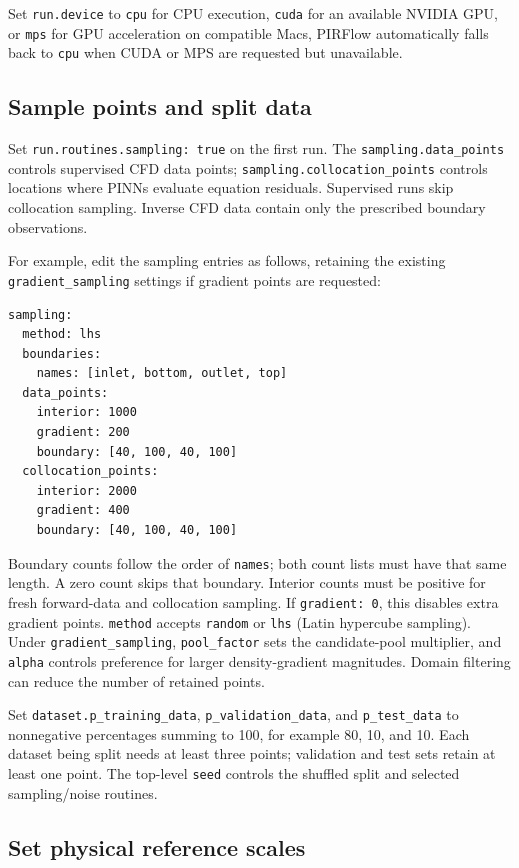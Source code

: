 \documentclass[11pt,a4paper]{article}
\newcommand{\code}[1]{\nolinkurl{#1}}
\begin{document}
Set \code{run.device} to \code{cpu} for CPU execution, \code{cuda} for an
available NVIDIA GPU, or \code{mps} for GPU acceleration on compatible Macs,
PIRFlow automatically falls back to \code{cpu} when CUDA or MPS are requested
but unavailable. 

\subsection{Sample points and split data}

Set \code{run.routines.sampling: true} on the first run. The 
\code{sampling.data_points} controls supervised CFD data points; 
\code{sampling.collocation_points} controls locations where PINNs evaluate 
equation residuals. Supervised runs skip collocation sampling. Inverse CFD 
data contain only the prescribed boundary observations.

For example, edit the sampling entries as follows, retaining the existing
\code{gradient_sampling} settings if gradient points are requested:

\begin{lstlisting}
sampling:
  method: lhs
  boundaries:
    names: [inlet, bottom, outlet, top]
  data_points:
    interior: 1000
    gradient: 200
    boundary: [40, 100, 40, 100]
  collocation_points:
    interior: 2000
    gradient: 400
    boundary: [40, 100, 40, 100]
\end{lstlisting}

Boundary counts follow the order of \code{names}; both count lists must have that
same length. A zero count skips that boundary. Interior counts must be positive
for fresh forward-data and collocation sampling. If \code{gradient: 0}, this 
disables extra gradient points. \code{method} accepts \code{random} or \code{lhs} 
(Latin hypercube sampling). Under \code{gradient_sampling}, \code{pool_factor}
sets the candidate-pool multiplier, and \code{alpha} controls preference for
larger density-gradient magnitudes. Domain filtering can reduce the number of
retained points.

Set \code{dataset.p_training_data}, \code{p_validation_data}, and \code{p_test_data} to
nonnegative percentages summing to 100, for example 80, 10, and 10. Each dataset
being split needs at least three points; validation and test sets retain at
least one point. The top-level \code{seed} controls the shuffled split and selected
sampling/noise routines.

\subsection{Set physical reference scales}
\end{document}
